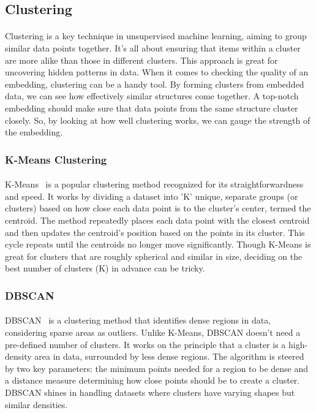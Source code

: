 \subsection{Clustering}
    \paragraph{}Clustering is a key technique in unsupervised machine learning, aiming to group similar data points together. It's all about ensuring that items within a cluster are more alike than those in different clusters. This approach is great for uncovering hidden patterns in data. When it comes to checking the quality of an embedding, clustering can be a handy tool. By forming clusters from embedded data, we can see how effectively similar structures come together. A top-notch embedding should make sure that data points from the same structure cluster closely. So, by looking at how well clustering works, we can gauge the strength of the embedding.

    \subsubsection{K-Means Clustering}
        \paragraph*{}K-Means~\cite{macqueen_methods_1967} is a popular clustering method recognized for its straightforwardness and speed. It works by dividing a dataset into 'K' unique, separate groups (or clusters) based on how close each data point is to the cluster's center, termed the centroid. The method repeatedly places each data point with the closest centroid and then updates the centroid's position based on the points in its cluster. This cycle repeats until the centroids no longer move significantly. Though K-Means is great for clusters that are roughly spherical and similar in size, deciding on the best number of clusters (K) in advance can be tricky.

    \subsubsection{DBSCAN}
        \paragraph*{}DBSCAN~\cite{ester_density-based_1996} is a clustering method that identifies dense regions in data, considering sparse areas as outliers. Unlike K-Means, DBSCAN doesn't need a pre-defined number of clusters. It works on the principle that a cluster is a high-density area in data, surrounded by less dense regions. The algorithm is steered by two key parameters: the minimum points needed for a region to be dense and a distance measure determining how close points should be to create a cluster. DBSCAN shines in handling datasets where clusters have varying shapes but similar densities.
